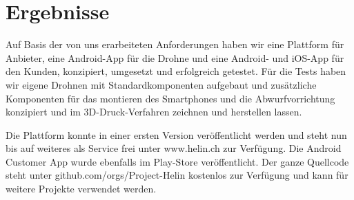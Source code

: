 \section*{Ergebnisse }

Auf Basis der von uns erarbeiteten Anforderungen haben wir eine Plattform für Anbieter, eine Android-App für die Drohne und eine Android- und iOS-App für den Kunden, konzipiert, umgesetzt und erfolgreich getestet. Für die Tests haben wir eigene Drohnen mit Standardkomponenten aufgebaut und zusätzliche Komponenten für das montieren des Smartphones und die Abwurfvorrichtung konzipiert und im 3D-Druck-Verfahren zeichnen und herstellen lassen. 

Die Plattform konnte in einer ersten Version veröffentlicht werden und steht nun bis auf weiteres als Service frei unter www.helin.ch zur Verfügung. Die Android Customer App wurde ebenfalls im Play-Store veröffentlicht. Der ganze Quellcode steht unter github.com/orgs/Project-Helin kostenlos zur Verfügung und kann für weitere Projekte verwendet werden.